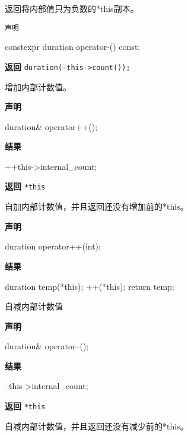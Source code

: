 
返回将内部值只为负数的*this副本。

\texttt{声明}

\begin{cpp}
constexpr duration operator-() const;
\end{cpp}

\textbf{返回}
\texttt{duration(--this->count());}


增加内部计数值。

\textbf{声明}

\begin{cpp}
duration& operator++();
\end{cpp}

\textbf{结果}

\begin{cpp}
++this->internal_count;
\end{cpp}

\textbf{返回}
\texttt{*this}


自加内部计数值，并且返回还没有增加前的*this。

\textbf{声明}

\begin{cpp}
duration operator++(int);
\end{cpp}

\textbf{结果}

\begin{cpp}
duration temp(*this);
++(*this);
return temp;
\end{cpp}


自减内部计数值

\textbf{声明}

\begin{cpp}
duration& operator--();
\end{cpp}

\textbf{结果}

\begin{cpp}
--this->internal_count;
\end{cpp}

\textbf{返回}
\texttt{*this}


自减内部计数值，并且返回还没有减少前的*this。

